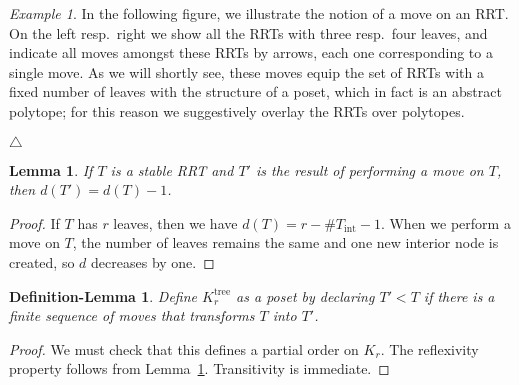 \documentclass[11pt]{amsart}
\newtheorem{lemma}[theorem]{Lemma}
\newtheorem{deflem}[theorem]{Definition-Lemma}
\theoremstyle{definition}
\theoremstyle{remark}
\newtheorem{example}[theorem]{Example}
\theoremstyle{plain}
\newcommand{\on}{\operatorname}
\newcommand{\inte}{{\on{int}}}
\newcommand{\tree}{{\on{tree}}}
\begin{document}
\begin{figure}[H]
\centering
\def\svgwidth{0.4\columnwidth}

\label{fig:T_moves}
\end{figure}


\begin{example}
In the following figure, we illustrate the notion of a move on an RRT.
On the left resp.\ right we show all the RRTs with three resp.\ four leaves, and indicate all moves amongst these RRTs by arrows, each one corresponding to a single move.
As we will shortly see, these moves equip the set of RRTs with a fixed number of leaves with the structure of a poset, which in fact is an abstract polytope; for this reason we suggestively overlay the RRTs over polytopes.

\begin{figure}[H]
\centering
\def\svgwidth{0.65\columnwidth}

\label{fig:RRT_moves}
\end{figure}
\null\hfill$\triangle$
\end{example}


\begin{lemma}
\label{lem:Kr_move_dim}
If $T$ is a stable RRT and $T'$ is the result of performing a move on $T$, then $d(T') = d(T)-1$.
\end{lemma}

\begin{proof}
If $T$ has $r$ leaves, then we have $d(T) = r - \#\!T_\inte - 1$.
When we perform a move on $T$, the number of leaves remains the same and one new interior node is created, so $d$ decreases by one.
\end{proof}

\begin{deflem}
\label{deflem:Krtree_poset}
Define $K_r^\tree$ as a poset by declaring $T' < T$ if there is a finite sequence of moves that transforms $T$ into $T'$.
\end{deflem}

\begin{proof}
We must check that this defines a partial order on $K_r$.
The reflexivity property follows from Lemma~\ref{lem:Kr_move_dim}.
Transitivity is immediate.
\end{proof}
\end{document}
